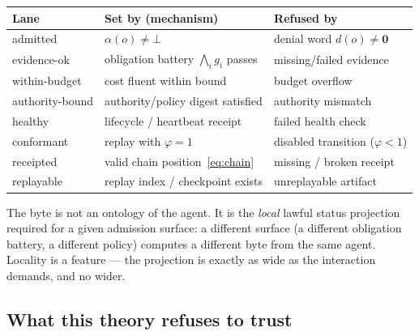 \documentclass[11pt,oneside]{book}
\theoremstyle{definition}
\theoremstyle{plain}
\theoremstyle{remark}
\newcommand{\adm}{\alpha}                      %
\newcommand{\Rfsl}{\bot}                       %
\newcommand{\Fitness}{\varphi}
\begin{document}
\begin{center}
\small
\begin{tabular}{lll}
\toprule
Lane & Set by (mechanism) & Refused by\\
\midrule
\textsf{admitted} & $\adm(o)\ne\Rfsl$ & denial word $d(o)\ne\bm 0$\\
\textsf{evidence-ok} & obligation battery $\bigwedge_i g_i$ passes & missing/failed evidence\\
\textsf{within-budget} & cost fluent within bound & budget overflow\\
\textsf{authority-bound} & authority/policy digest satisfied & authority mismatch\\
\textsf{healthy} & lifecycle / heartbeat receipt & failed health check\\
\textsf{conformant} & replay with $\Fitness=1$ & disabled transition ($\Fitness<1$)\\
\textsf{receipted} & valid chain position~\eqref{eq:chain} & missing / broken receipt\\
\textsf{replayable} & replay index / checkpoint exists & unreplayable artifact\\
\bottomrule
\end{tabular}
\end{center}

The byte is not an ontology of the agent. It is the \emph{local} lawful status projection
required for a given admission surface: a different surface (a different obligation battery,
a different policy) computes a different byte from the same agent. Locality is a feature ---
the projection is exactly as wide as the interaction demands, and no wider.

\subsection*{What this theory refuses to trust}
\end{document}
